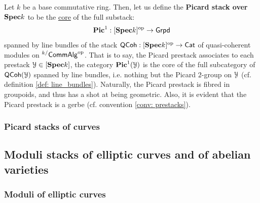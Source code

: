                 \begin{definition} \label{def: picard_prestacks}
                    Let $k$ be a base commutative ring. Then, let us define the \textbf{Picard stack over $\mathbf{Spec} k$} to be the \href{https://ncatlab.org/nlab/show/core}{\underline{core}} of the full substack:
                        $$\mathbf{Pic}^1: [\mathbf{Spec} k]^{\mathrm{op}} \to \mathsf{Grpd}$$
                    spanned by line bundles of the stack $\mathsf{QCoh}: [\mathbf{Spec} k]^{\mathrm{op}} \to \mathsf{Cat}$ of quasi-coherent modules on ${}^{k/}\mathsf{Comm}\mathsf{Alg}^{\mathrm{op}}$. That is to say, the Picard prestack associates to each prestack $\mathcal{Y} \in [\mathbf{Spec} k]$, the category $\mathbf{Pic}^1(\mathcal{Y})$ is the core of the full subcategory of $\mathsf{QCoh}(\mathcal{Y})$ spanned by line bundles, i.e. nothing but the Picard $2$-group on $\mathcal{Y}$ (cf. definition \ref{def: line_bundles}). Naturally, the Picard prestack is fibred in groupoids, and thus has a shot at being geometric. Also, it is evident that the Picard prestack is a gerbe (cf. convention \ref{conv: prestacks}).
                \end{definition}
            
            \subsubsection{Picard stacks of curves}
        
        \subsection{Moduli stacks of elliptic curves and of abelian varieties}
            \subsubsection{Moduli of elliptic curves}
